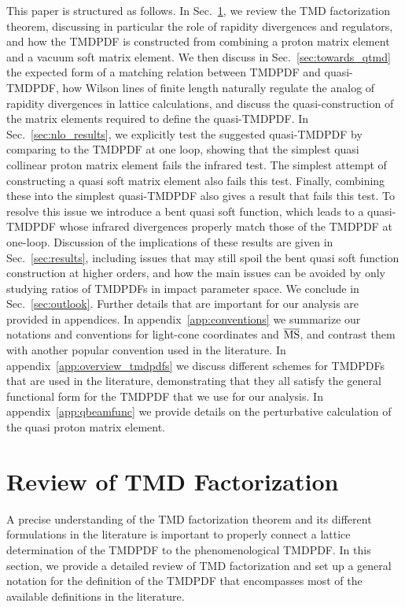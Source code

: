 \documentclass[11pt,a4paper]{article}
\DeclareRobustCommand{\app}[1]{appendix~\ref{app:#1}}
\DeclareRobustCommand{\sec}[1]{Sec.~\ref{sec:#1}}
\begin{document}
This paper is structured as follows.
In \sec{tmd_review}, we review the TMD factorization theorem,
discussing in particular the role of rapidity divergences and regulators, and how the TMDPDF is constructed from combining a proton matrix element and a vacuum soft matrix element.
We then discuss in \sec{towards_qtmd} the expected form of a matching relation between TMDPDF and quasi-TMDPDF, how Wilson lines of finite length naturally regulate the analog of rapidity divergences in lattice calculations, and discuss the quasi-construction of the matrix elements required to define the quasi-TMDPDF.
In \sec{nlo_results}, we explicitly test the suggested quasi-TMDPDF by comparing to the TMDPDF at one loop, showing that the simplest quasi collinear proton matrix element fails the infrared test. The simplest attempt of constructing a quasi soft matrix element also fails this test. Finally, combining these into the simplest quasi-TMDPDF also gives a result that fails this test.
To resolve this issue we introduce a bent quasi soft function, which leads to a quasi-TMDPDF whose infrared divergences properly match those of the TMDPDF at one-loop.
Discussion of the implications of these results are given in \sec{results}, 
including issues that may still spoil the bent quasi soft function construction at higher orders, and how the main issues can be avoided by only studying ratios of TMDPDFs in impact parameter space.
We conclude in \sec{outlook}.  
Further details that are important for our analysis are provided in appendices. In \app{conventions} we summarize our notations and conventions for light-cone coordinates and $\overline{\rm MS}$, and contrast them with another popular convention used in the literature. In \app{overview_tmdpdfs} we discuss different schemes for TMDPDFs that are used in the literature, demonstrating that they all satisfy the general functional form for the TMDPDF that we use for our analysis.
In \app{qbeamfunc} we provide details on the perturbative calculation of the quasi proton matrix element. 




\section{Review of TMD Factorization}
\label{sec:tmd_review}

A precise understanding of the TMD factorization theorem and its different formulations in the literature is important to properly connect a lattice determination of the TMDPDF to the phenomenological TMDPDF.
In this section, we provide a detailed review of TMD factorization and set up a general notation for the definition of the TMDPDF that encompasses most of the available definitions in the literature.
\end{document}
